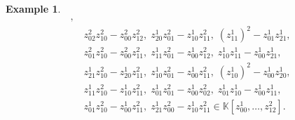 \documentclass[12pt,reqno]{amsart}   	%
\theoremstyle{plain}
\newtheorem{corollary}[theorem]{Corollary}
\theoremstyle{definition}
\newtheorem{example}[theorem]{Example}
\theoremstyle{remark}
\begin{document}
\begin{example}
\begin{align*}
,\; \\ &z^2_{02}z^2_{10} - z^2_{00}z^2_{12},\;z^1_{20}z^2_{01} - z^1_{10}z^2_{11},\;(z^1_{11})^2 - z^1_{01}z^1_{21} 
,\; \\ &z^2_{01}z^2_{10} - z^2_{00}z^2_{11},\;z^1_{11}z^2_{01} - z^1_{00}z^2_{12},\;z^1_{10}z^1_{11} - z^1_{00}z^1_{21} 
,\; \\ &z^1_{21}z^2_{10} - z^1_{20}z^2_{11},\;z^1_{10}z^2_{01} - z^1_{00}z^2_{11},\;(z^1_{10})^2 - z^1_{00}z^1_{20} 
,\; \\ &z^1_{11}z^2_{10} - z^1_{10}z^2_{11},\;z^1_{01}z^2_{01} - z^1_{00}z^2_{02},\;z^1_{01}z^1_{10} - z^1_{00}z^1_{11} 
,\; \\ &z^1_{01}z^2_{10} - z^1_{00}z^2_{11},\;z^1_{21}z^2_{00} - z^1_{10}z^2_{11}
\in \mathbb{K}[z^1_{00},\dots,z^2_{12}].    
\end{align*}
\end{example}

\end{document}
